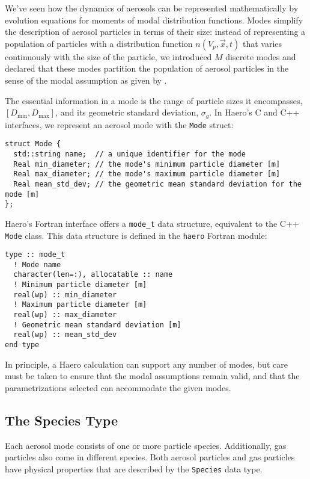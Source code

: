 We've seen how the dynamics of aerosols can be represented mathematically
by evolution equations for moments of modal distribution functions. Modes
simplify the description of aerosol particles in terms of their size: instead of
representing a population of particles with a distribution function
$n(V_p, \vec{x}, t)$ that varies continuously with the size of the particle, we
introduced $M$ discrete modes and declared that these modes partition the
population of aerosol particles in the sense of the modal assumption as given
by .

The essential information in a mode is the range of particle sizes it
encompasses, $[D_{\min}, D_{\max}]$, and its geometric standard deviation,
$\sigma_g$. In Haero's C and C++ interfaces,
we represent an aerosol mode with the \texttt{Mode} struct:

\begin{lstlisting}
struct Mode {
  std::string name;  // a unique identifier for the mode
  Real min_diameter; // the mode's minimum particle diameter [m]
  Real max_diameter; // the mode's maximum particle diameter [m]
  Real mean_std_dev; // the geometric mean standard deviation for the mode [m]
};
\end{lstlisting}

Haero's Fortran interface offers a \texttt{mode\_t} data structure, equivalent to
the C++ \texttt{Mode} class. This data structure is defined in the \texttt{haero}
Fortran module:

\begin{lstlisting}
type :: mode_t
  ! Mode name
  character(len=:), allocatable :: name
  ! Minimum particle diameter [m]
  real(wp) :: min_diameter
  ! Maximum particle diameter [m]
  real(wp) :: max_diameter
  ! Geometric mean standard deviation [m]
  real(wp) :: mean_std_dev
end type
\end{lstlisting}

In principle, a Haero calculation can support any number of modes, but care
must be taken to ensure that the modal assumptions remain valid, and that
the parametrizations selected can accommodate the given modes.

\subsection{The Species Type}

Each aerosol mode consists of one or more particle species. Additionally,
gas particles also come in different species. Both aerosol particles and
gas particles have physical properties that are described by the
\texttt{Species} data type.

